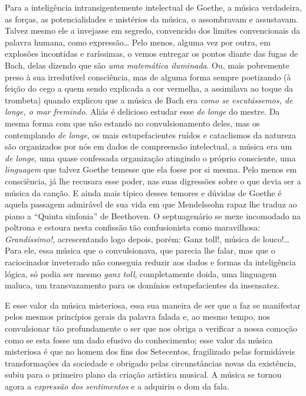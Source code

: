 Para a inteligência intransigentemente intelectual de Goethe, a música
verdadeira, as forças, as potencialidades e mistérios da música, o
assombravam e assustavam. Talvez mesmo ele a invejasse em segredo,
convencido dos limites convencionais da palavra humana, como
expressão\ldots{} Pelo menos, alguma vez por outra, em explosões incontidas e
raríssimas, o vemos entregar os pontos diante das fugas de Bach, delas
dizendo que são \textit{uma matemática iluminada}. Ou, mais pobremente preso
à sua irredutível consciência, mas de alguma forma sempre poetizando (à
feição do cego a quem sendo explicada a cor vermelha, a assimilava ao
toque da trombeta) quando explicou que a música de Bach era \textit{como se
escutássemos, de longe, o mar fremindo}. Aliás é delicioso estudar esse
\textit{de longe} do mestre. Da mesma forma com que não estando no
convulsionamento deles, mas os contemplando \textit{de longe}, os mais
estupefacientes ruídos e cataclismos da natureza são organizados por nós
em dados de compreensão intelectual, a música era um \textit{de longe}, uma
quase confessada organização atingindo o próprio consciente, uma
\textit{linguagem} que talvez Goethe temesse que ela fosse por si mesma. Pelo
menos em consciência, já lhe recusara esse poder, nas suas digressões
sobre o que devia ser a música da canção. E ainda mais típico desses
temores e dúvidas de Goethe é aquela passagem admirável de sua vida em
que Mendelssohn rapaz lhe traduz ao piano a ``Quinta sinfonia'' de
Beethoven. O septuagenário se mexe incomodado na poltrona e estoura
nesta confissão tão confusionista como maravilhosa: \textit{Grandíssimo!},
acrescentando logo depois, porém: Ganz toll!, música de louco!\ldots{} Para
ele, essa música que o convulsionava, que parecia lhe falar, mas que
o raciocinador inveterado não conseguia reduzir aos dados e formas da
inteligência lógica, só podia ser mesmo \textit{ganz toll}, completamente doida,
uma linguagem maluca, um transvazamento para os domínios estupefacientes
da insensatez.

E esse valor da música misteriosa, essa sua maneira de ser que a faz se
manifestar pelos mesmos princípios gerais da palavra falada e, ao mesmo
tempo, nos convulsionar tão profundamente o ser que nos obriga a
verificar a nossa comoção como se esta fosse um dado efusivo do
conhecimento; esse valor da música misteriosa é que no homem dos fins
dos Setecentos, fragilizado pelas formidáveis transformações da
sociedade e obrigado pelas circunstâncias novas da existência, subiu
para o primeiro plano da criação artística musical. A música se tornou
agora a \textit{expressão dos sentimentos} e a adquiriu o dom da fala.

